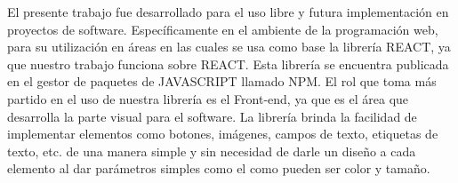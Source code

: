 El presente trabajo fue desarrollado para el uso libre y futura implementación en proyectos de software. Específicamente en el ambiente de la programación web, para su utilización en áreas en las cuales se usa como base la librería REACT, ya que nuestro trabajo funciona sobre REACT.
 \newline
  \newline
Esta librería se encuentra publicada en el gestor de paquetes de JAVASCRIPT llamado NPM. 
 \newline
  \newline
El rol que toma más partido en el uso de nuestra librería es el Front-end, ya que es el área que desarrolla la parte visual para el software. La librería brinda la facilidad de implementar elementos como botones, imágenes, campos de texto, etiquetas de texto, etc. de una manera simple y sin necesidad de darle un diseño a cada elemento al dar parámetros simples como el como pueden ser color y tamaño.

